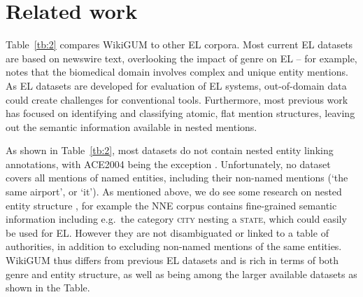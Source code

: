 \documentclass[11pt,a4paper]{article}
\begin{document}
\section{Related work}

Table~\ref{tb:2} compares WikiGUM to other EL corpora. Most current EL datasets are based on newswire text, overlooking the impact of genre on EL -- for example, \citet{dai2018biomed} notes that the biomedical domain involves complex and unique entity mentions. As EL datasets are developed for evaluation of EL systems, out-of-domain data could create challenges for conventional tools. Furthermore, most previous work \cite{cucerzan2007msnbc,ji2015tackbp15, kulkarni2009iitb,milne2008aquaint,ratinov2011ace} has focused on identifying and classifying atomic, flat mention structures, leaving out the semantic information available in nested mentions. 

As shown in Table~\ref{tb:2}, most datasets do not contain nested entity linking annotations, with ACE2004 being the exception \cite{ratinov2011ace}. Unfortunately, no dataset covers all mentions of named entities, including their non-named mentions (`the same airport', or `it'). As mentioned above, we do see some research on nested entity structure \cite{glavavs2014constructing,hong2016building}, for example the NNE corpus  \cite{ringland2019nne} contains fine-grained semantic information including e.g.~the category \textsc{city} nesting a \textsc{state}, which could easily be used for EL. However they are not disambiguated or linked to a table of authorities, in addition to excluding non-named mentions of the same entities. WikiGUM thus differs from previous EL datasets and is rich in terms of both genre and entity structure, as well as being among the larger available datasets as shown in the Table.
\end{document}

